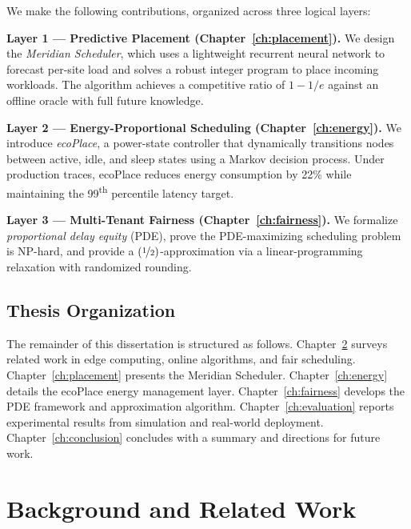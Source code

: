 \documentclass[12pt,oneside]{book}
\begin{document}
We make the following contributions, organized across three logical layers:

\begin{tcolorbox}[
  colback=uclablue!4,
  colframe=uclablue!40,
  boxrule=0.5pt,
  arc=3pt,
  left=10pt,
  right=10pt,
  top=8pt,
  bottom=8pt,
  breakable
]
\singlespacing
\small
\textbf{Layer 1 --- Predictive Placement (Chapter~\ref{ch:placement}).}
We design the \emph{Meridian Scheduler}, which uses a lightweight recurrent
neural network to forecast per-site load and solves a robust integer program
to place incoming workloads. The algorithm achieves a competitive ratio of
\(1 - 1/e\) against an offline oracle with full future knowledge.

\medskip
\textbf{Layer 2 --- Energy-Proportional Scheduling (Chapter~\ref{ch:energy}).}
We introduce \emph{ecoPlace}, a power-state controller that dynamically
transitions nodes between active, idle, and sleep states using a Markov
decision process. Under production traces, ecoPlace reduces energy consumption
by 22\% while maintaining the 99\textsuperscript{th} percentile latency target.

\medskip
\textbf{Layer 3 --- Multi-Tenant Fairness (Chapter~\ref{ch:fairness}).}
We formalize \emph{proportional delay equity} (PDE), prove the PDE-maximizing
scheduling problem is NP-hard, and provide a \((\nicefrac{1}{2})\)-approximation
via a linear-programming relaxation with randomized rounding.
\end{tcolorbox}

\section{Thesis Organization}

The remainder of this dissertation is structured as follows.
Chapter~\ref{ch:background} surveys related work in edge computing, online
algorithms, and fair scheduling. Chapter~\ref{ch:placement} presents the
Meridian Scheduler. Chapter~\ref{ch:energy} details the ecoPlace energy
management layer. Chapter~\ref{ch:fairness} develops the PDE framework and
approximation algorithm. Chapter~\ref{ch:evaluation} reports experimental
results from simulation and real-world deployment. Chapter~\ref{ch:conclusion}
concludes with a summary and directions for future work.

\chapter{Background and Related Work}
\label{ch:background}
\end{document}
